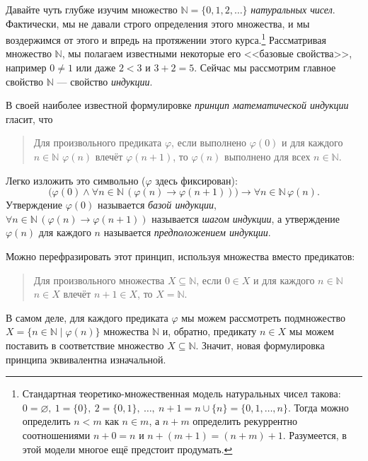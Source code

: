 \documentclass[12pt,notitlepage]{article}
\theoremstyle{plain}
\theoremstyle{definition}
\theoremstyle{plain}
\newcommand{\N}{\mathbb{N}}
\newcommand{\sbs}{\subseteq}
\newcommand{\void}{\varnothing}
\renewcommand{\phi}{\varphi}
\newcommand{\1}{\mathbf{1}}
\newcommand{\0}{\mathbf{0}}
\newcommand{\mcomm}[1]{}
\begin{document}
Давайте чуть глубже изучим множество $\N = \{0, 1, 2,\ldots \}$ \emph{натуральных чисел}. Фактически, мы не давали строго определения этого множества, и мы воздержимся от этого и впредь на протяжении этого курса.\footnote{Стандартная теоретико-множественная модель натуральных чисел такова: $0 = \void,\ 1 = \{0\},\ 2 = \{ 0, 1 \},\ \ldots,\ n + 1 = n \cup \{ n\} = \{0,1,\ldots, n \}$. Тогда можно определить $n < m$ как $n \in m$, а $n + m$ определить рекуррентно соотношениями $n + 0 = n$ и $n + (m + 1) = (n + m) + 1$. Разумеется, в этой модели многое ещё предстоит продумать.} Рассматривая множество $\N$, мы полагаем известными некоторые его <<базовые свойства>>, например $0 \neq 1$ или даже $2 < 3$ и $3 + 2 = 5$. Сейчас мы рассмотрим главное свойство $\N$ --- свойство \emph{индукции}.

В своей наиболее известной формулировке \emph{принцип математической индукции} гласит, что
\begin{quote}
	Для произвольного предиката $\phi$, если выполнено $\phi(0)$ и для каждого $n \in \N$ $\phi(n)$ влечёт $\phi(n+1)$, то $\phi(n)$ выполнено для всех $n \in \N$.
\end{quote}
Легко изложить это символьно ($\phi$ здесь фиксирован):
$$\bigl(\phi(0) \wedge \forall n\in \N \, (\phi(n) \to \phi(n+1))\bigr) \to \forall n \in \N\, \phi(n).$$
Утверждение $\phi(0)$ называется \emph{базой индукции}, $\forall n \in \N\, (\phi(n) \to \phi(n+1))$ называется \emph{шагом индукции}, а утверждение $\phi(n)$ для каждого $n$ называется \emph{предположением индукции}.

\mcomm{If the Instructor has skipped the chapter on strings, I suggest he proves `intuitive validity' of the Induction Principle similarly to Example~\ref{strings:ind_intuition}.}

\noindent Можно перефразировать этот принцип, используя множества вместо предикатов:
\begin{quote}
	Для произвольного множества $X \sbs \N$, если $0 \in X$ и для каждого $n \in \N$ $n \in X$ влечёт $n+1 \in X$, то $X = \N$.
\end{quote}
В самом деле, для каждого предиката $\phi$ мы можем рассмотреть подмножество $X = \{ n \in \N \mid \phi(n) \}$ множества $\N$ и, обратно, предикату $n \in X$ мы можем поставить в соответствие множество $X \sbs \N$. Значит, новая формулировка принципа эквивалентна изначальной.

\mcomm{In practice, the students usually ask me to elaborate on this point. Sometimes, we abandon the `set version' of induction (except for the Least Number Principle, of course) altogether.}
\end{document}
